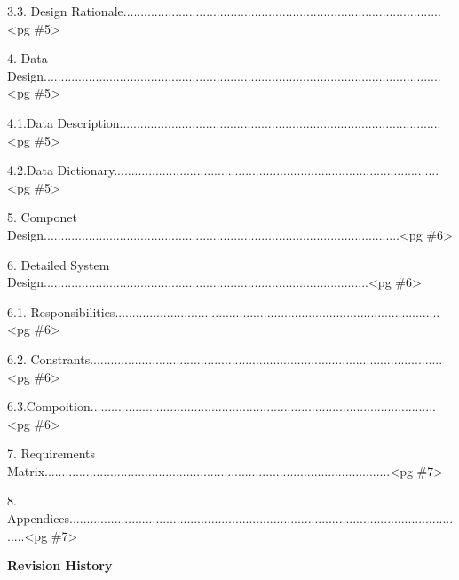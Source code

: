\documentclass[
]{article}
\begin{document}
3.3. Design
Rationale............................................................................................\textless pg
\#5\textgreater{}

4. Data
Design...................................................................................................................\textless pg
\#5\textgreater{}

4.1.Data
Description.............................................................................................\textless pg
\#5\textgreater{}

4.2.Data
Dictionary..............................................................................................\textless pg
\#5\textgreater{}

5. Componet
Design.......................................................................................................\textless pg
\#6\textgreater{}

6. Detailed System
Design..............................................................................................\textless pg
\#6\textgreater{}

6.1.
Responsibilities..............................................................................................\textless pg
\#6\textgreater{}

6.2.
Constrants......................................................................................................\textless pg
\#6\textgreater{}

6.3.Compoition....................................................................................................\textless pg
\#6\textgreater{}

7. Requirements
Matrix....................................................................................................\textless pg
\#7\textgreater{}

8.
Appendices....................................................................................................................\textless pg
\#7\textgreater{}

\textbf{Revision History}
\end{document}
